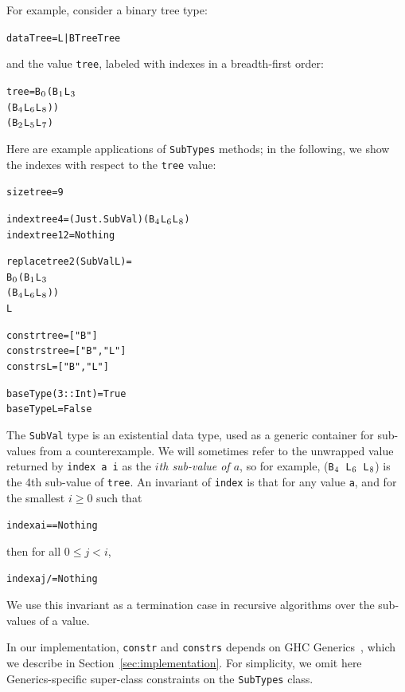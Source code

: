 \documentclass[10pt]{sigplanconf}
\newenvironment{code}{\begin{alltt}\small}{\end{alltt}}
\newcommand{\ttp}[1]{\texttt{#1}}
\newcommand{\sub}[1]{\(\sb{#1}\)}
\begin{document}
\noindent
For example, consider a binary tree type:
%
\begin{code}
data Tree = L | B Tree Tree
\end{code}
%
\noindent
and the value \ttp{tree}, labeled with indexes in a breadth-first order:
%
\begin{code}
tree = B\sub{0} (B\sub{1} L\sub{3}
             (B\sub{4} L\sub{6} L\sub{8}))
          (B\sub{2} L\sub{5} L\sub{7})
\end{code}
%
\noindent
Here are example applications of \ttp{SubTypes} methods; in the following, we
show the indexes with respect to the \ttp{tree} value:
%
\begin{code}
size tree = 9

index tree 4  = (Just . SubVal) (B\sub{4} L\sub{6} L\sub{8})
index tree 12 = Nothing

replace tree 2 (SubVal L) =
  B\sub{0} (B\sub{1} L\sub{3}
        (B\sub{4} L\sub{6} L\sub{8}))
     L

constr  tree = ["B"]
constrs tree = ["B", "L"]
constrs L    = ["B", "L"]

baseType (3 :: Int) = True
baseType L          = False
\end{code}
%
\noindent
The \ttp{SubVal} type is an existential data type, used as a generic container
for sub-values from a counterexample.  We will sometimes refer to the unwrapped
value returned by \ttp{index a i} as the \emph{$i$th sub-value of $a$}, so for
example, (\ttp{B\sub{4} L\sub{6} L\sub{8}}) is the 4th sub-value of \ttp{tree}.
An invariant of \ttp{index} is that for any value \ttp{a}, and for the smallest
$i \geq 0$ such that
%
\begin{code}
index a i == Nothing
\end{code}
%
\noindent
then for all $0 \leq j < i$,
%
\begin{code}
index a j /= Nothing
\end{code}
\noindent
We use this invariant as a termination case in recursive algorithms over the
sub-values of a value.

In our implementation, \ttp{constr} and \ttp{constrs} depends on GHC
Generics~\cite{generics}, which we describe in Section~\ref{sec:implementation}.
For simplicity, we omit here Generics-specific super-class constraints on the
\ttp{SubTypes} class.


\end{document}
